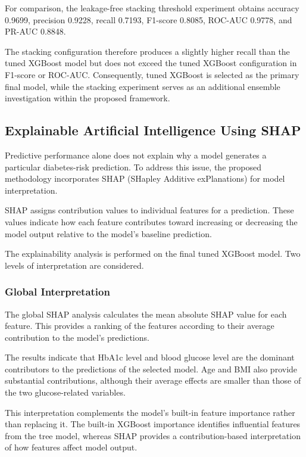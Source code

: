 \documentclass[conference]{IEEEtran}
\begin{document}
For comparison, the leakage-free stacking threshold experiment obtains accuracy 0.9699, precision 0.9228, recall 0.7193, F1-score 0.8085, ROC-AUC 0.9778, and PR-AUC 0.8848.

The stacking configuration therefore produces a slightly higher recall than the tuned XGBoost model but does not exceed the tuned XGBoost configuration in F1-score or ROC-AUC. Consequently, tuned XGBoost is selected as the primary final model, while the stacking experiment serves as an additional ensemble investigation within the proposed framework.

\subsection{Explainable Artificial Intelligence Using SHAP}

Predictive performance alone does not explain why a model generates a particular diabetes-risk prediction. To address this issue, the proposed methodology incorporates SHAP (SHapley Additive exPlanations) for model interpretation.

SHAP assigns contribution values to individual features for a prediction. These values indicate how each feature contributes toward increasing or decreasing the model output relative to the model's baseline prediction.

The explainability analysis is performed on the final tuned XGBoost model. Two levels of interpretation are considered.

\subsubsection{Global Interpretation}

The global SHAP analysis calculates the mean absolute SHAP value for each feature. This provides a ranking of the features according to their average contribution to the model's predictions.

The results indicate that HbA1c level and blood glucose level are the dominant contributors to the predictions of the selected model. Age and BMI also provide substantial contributions, although their average effects are smaller than those of the two glucose-related variables.

This interpretation complements the model's built-in feature importance rather than replacing it. The built-in XGBoost importance identifies influential features from the tree model, whereas SHAP provides a contribution-based interpretation of how features affect model output.
\end{document}
